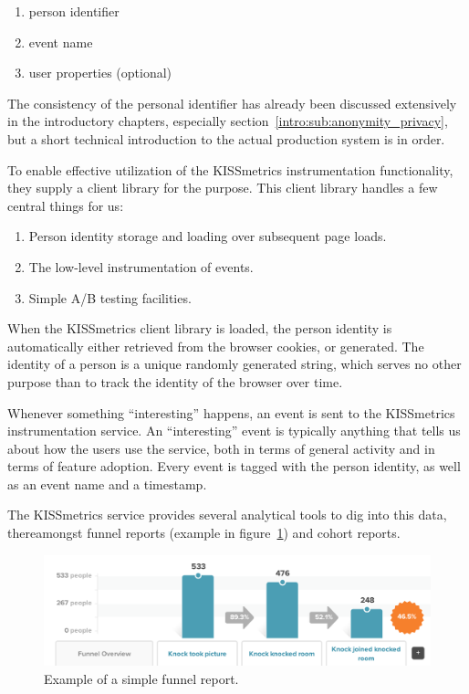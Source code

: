\begin{enumerate}
  \item person identifier
  \item event name
  \item user properties (optional)
\end{enumerate}

The consistency of the personal identifier has already been discussed extensively in the introductory chapters, especially section~\ref{intro:sub:anonymity_privacy}, but a short technical introduction to the actual production system is in order.

To enable effective utilization of the KISSmetrics instrumentation functionality, they supply a client library for the purpose. This client library handles a few central things for us:

\begin{enumerate}
  \item Person identity storage and loading over subsequent page loads.
  \item The low-level instrumentation of events.
  \item Simple A/B testing facilities.
\end{enumerate}

When the KISSmetrics client library is loaded, the person identity is automatically either retrieved from the browser cookies, or generated. The identity of a person is a unique randomly generated string, which serves no other purpose than to track the identity of the browser over time.

Whenever something ``interesting'' happens, an event is sent to the KISSmetrics instrumentation service. An ``interesting'' event is typically anything that tells us about how the users use the service, both in terms of general activity and in terms of feature adoption. Every event is tagged with the person identity, as well as an event name and a timestamp.

The KISSmetrics service provides several analytical tools to dig into this data, thereamongst funnel reports (example in figure~\ref{fig:funnel-report}) and cohort reports.

\begin{figure}[h]
  \centering
    \includegraphics[width=\textwidth]{Figures/screenshots/km/funnel-example}
    \caption{Example of a simple funnel report.}
    \label{fig:funnel-report}
\end{figure}

